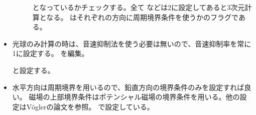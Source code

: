 \documentclass[letterpaper,10pt,dvipdfmx,report]{sphinxmanual}
\begin{document}
\begin{itemize}
\begin{description}
\begin{sphinxVerbatim}[commandchars=\\\{\}]

\end{sphinxVerbatim}

\sphinxAtStartPar
となっているかチェックする。全て  などは2に設定してあると3次元計算となる。 はそれぞれの方向に周期境界条件を使うかのフラグである。

\end{description}

\item {} \begin{description}
\sphinxAtStartPar
光球のみ計算の時は、音速抑制法を使う必要は無いので、音速抑制率を常に1に設定する。
 を編集。

\begin{sphinxVerbatim}[commandchars=\\\{\}]





\end{sphinxVerbatim}

\sphinxAtStartPar
と設定する。

\end{description}

\item {} \begin{description}
\sphinxAtStartPar
水平方向は周期境界を用いるので、鉛直方向の境界条件のみを設定すれば良い。
磁場の上部境界条件はポテンシャル磁場の境界条件を用いる。他の設定はVöglerの論文を参照。
 で設定している。


\end{description}
\end{itemize}
\end{document}
